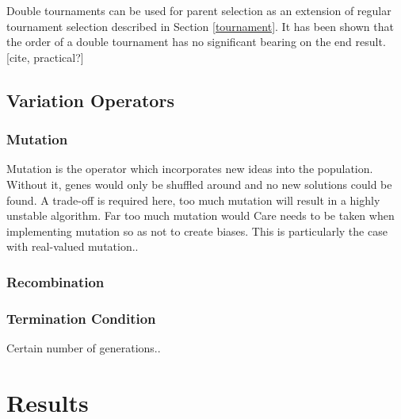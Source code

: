 \documentclass{article}
\begin{document}
\cite{parsimony_pressure}

Double tournaments can be used for parent selection as an extension of regular tournament selection described in Section \ref{tournament}.
It has been shown that the order of a double tournament has no significant bearing on the end result. [cite, practical?]

\cite{multi_objective_bloat}


\subsection{Variation Operators}
\subsubsection{Mutation}
Mutation is the operator which incorporates new ideas into the population. Without it, genes would only be shuffled around and no new solutions could be found. %
A trade-off is required here, too much mutation will result in a highly unstable algorithm. Far too much mutation would %
Care needs to be taken when implementing mutation so as not to create biases. This is particularly the case with real-valued mutation.. %

\subsubsection{Recombination}


\subsubsection{Termination Condition}
Certain number of generations..

\section{Results} %
\end{document}

